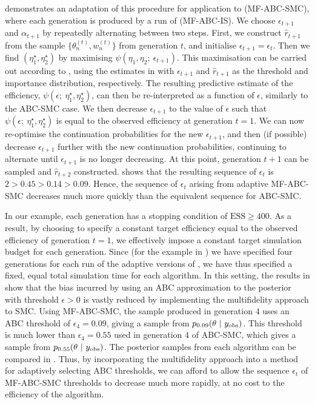 \documentclass[review,demo]{siamonline190516}
\begin{document}
 demonstrates an adaptation of this procedure for application to  (MF-ABC-SMC), where each generation is produced by a run of  (MF-ABC-IS).
We choose $\epsilon_{t+1}$ and $\alpha_{t+1}$ by repeatedly alternating between two steps.
First, we construct $\hat r_{t+1}$ from the sample $\{ \theta_n^{(t)}, w_n^{(t)} \}$ from generation $t$, and initialise $\epsilon_{t+1} = \epsilon_t$.
Then we find $(\eta_1^\star, \eta_2^\star)$ by maximising $\psi(\eta_1,\eta_2;~\epsilon_{t+1})$.
This maximisation can be carried out according to , using the estimates in  with $\epsilon_{t+1}$ and $\hat r_{t+1}$ as the threshold and importance distribution, respectively.
The resulting predictive estimate of the efficiency, $\psi(\epsilon;~\eta_1^\star, \eta_2^\star)$, can then be re-interpreted as a function of $\epsilon$, similarly to the ABC-SMC case.
We then decrease $\epsilon_{t+1}$ to the value of $\epsilon$ such that $\psi(\epsilon;~\eta_1^\star,\eta_2^\star)$ is equal to the observed efficiency at generation $t=1$.
We can now re-optimise the continuation probabilities for the new $\epsilon_{t+1}$, and then (if possible) decrease $\epsilon_{t+1}$ further with the new continuation probabilities, continuing to alternate until $\epsilon_{t+1}$ is no longer decreasing.
At this point, generation $t+1$ can be sampled and $\hat r_{t+2}$ constructed.
 shows that the resulting sequence of $\epsilon_t$ is $2 > 0.45 > 0.14 > 0.09$.
Hence, the sequence of $\epsilon_t$ arising from adaptive MF-ABC-SMC decreases much more quickly than the equivalent sequence for ABC-SMC.

In our example, each generation has a stopping condition of $\mathrm{ESS} \geq 400$.
As a result, by choosing to specify a constant target efficiency equal to the observed efficiency of generation $t=1$, we effectively impose a constant target simulation budget for each generation.
Since (for the example in ) we have specified four generations for each run of the adaptive versions of , we have thus specified a fixed, equal total simulation time for each algorithm.
In this setting, the results in  show that the bias incurred by using an ABC approximation to the posterior with threshold $\epsilon>0$ is vastly reduced by implementing the multifidelity approach to SMC.
Using MF-ABC-SMC, the sample produced in generation $4$ uses an ABC threshold of $\epsilon_4 = 0.09$, giving a sample from $p_{0.09}(\theta~|~y_{\mathrm{obs}})$.
This threshold is much lower than $\epsilon_4 = 0.55$ used in generation $4$ of ABC-SMC, which gives a sample from $p_{0.55}(\theta~|~y_{\mathrm{obs}})$.
The posterior samples from each algorithm can be compared in .
Thus, by incorporating the multifidelity approach into a method for adaptively selecting ABC thresholds, we can afford to allow the sequence $\epsilon_t$ of MF-ABC-SMC thresholds to decrease much more rapidly, at no cost to the efficiency of the algorithm.
\end{document}
